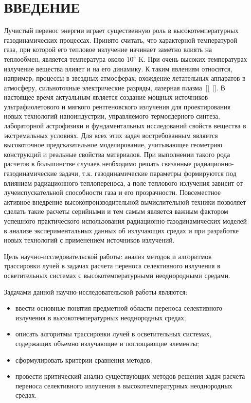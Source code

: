 \chapter*{\hfill ВВЕДЕНИЕ \hfill}

Лучистый перенос энергии играет существенную роль в высокотемпературных газодинамических процессах. Принято считать, что характерной температурой газа, при которой его тепловое излучение начинает заметно влиять на теплообмен, является температура около $10^4$ K. При очень высоких температурах излучение вещества влияет и на его динамику. К таким явлениям относятся, например, процессы в звездных атмосферах, вхождение летательных аппаратов в атмосферу, сильноточные электрические разряды, лазерная плазма~[\cite{found_gas}]~[\cite{mod_gas}]. В настоящее время актуальным является создание мощных источников ультрафиолетового и мягкого рентгеновского излучения для проектирования новых технологий наноиндустрии, управляемого термоядерного синтеза, лабораторной астрофизики и фундаментальных исследований свойств вещества в экстремальных условиях. Для всех этих задач востребованным является высокоточное предсказательное моделирование, учитывающее геометрию конструкций и реальные свойства материалов. При выполнении такого рода расчетов в большинстве случаев необходимо решать связанные радиационно-газодинамические задачи, т.к. газодинамические параметры формируются под влиянием радиационного теплопереноса, а поле теплового излучения зависит от лучеиспускательной способности газа и его прозрачности. Повсеместное активное внедрение высокопроизводительной вычислительной техники позволяет сделать такие расчеты серийными и тем самым является важным фактором успешного практического использования радиационно-газодинамических моделей в анализе экспериментальных данных об излучающих средах и при разработке новых технологий с применением источников излучений. 

Цель научно-исследовательской работы: анализ методов и алгоритмов трассировки лучей в задачах расчета переноса селективного излучения в осветительных системах с высокотемпературными неоднородными средами.

Задачами данной научно-исследовательской работы являются:
\begin{itemize}[label=---]
    \item ввести основные понятия предметной области переноса селективного излучения в высокотемпературных неоднородных средах;
    \item описать алгоритмы трассировки лучей в осветительных системах, содержащих объемно излучающие и поглощающие элементы;
    \item сформулировать критерии сравнения методов;
    \item провести критический анализ существующих методов решения задач расчета переноса селективного излучения в высокотемпературных неоднородных средах.
\end{itemize}
